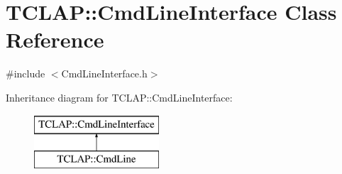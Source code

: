 \hypertarget{class_t_c_l_a_p_1_1_cmd_line_interface}{}\section{T\+C\+L\+A\+P\+:\+:Cmd\+Line\+Interface Class Reference}
\label{class_t_c_l_a_p_1_1_cmd_line_interface}


{\ttfamily \#include $<$Cmd\+Line\+Interface.\+h$>$}

Inheritance diagram for T\+C\+L\+A\+P\+:\+:Cmd\+Line\+Interface\+:\begin{figure}[H]
\begin{center}
\leavevmode
\includegraphics[height=2.000000cm]{class_t_c_l_a_p_1_1_cmd_line_interface}
\end{center}
\end{figure}
